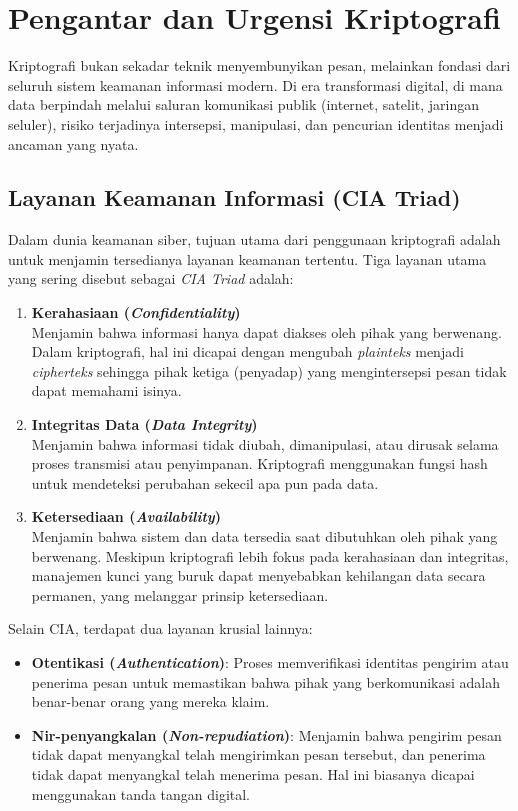 \section{Pengantar dan Urgensi Kriptografi}

Kriptografi bukan sekadar teknik menyembunyikan pesan, melainkan fondasi dari seluruh sistem keamanan informasi modern. Di era transformasi digital, di mana data berpindah melalui saluran komunikasi publik (internet, satelit, jaringan seluler), risiko terjadinya intersepsi, manipulasi, dan pencurian identitas menjadi ancaman yang nyata.

\subsection{Layanan Keamanan Informasi (CIA Triad)}

Dalam dunia keamanan siber, tujuan utama dari penggunaan kriptografi adalah untuk menjamin tersedianya layanan keamanan tertentu. Tiga layanan utama yang sering disebut sebagai \textit{CIA Triad} adalah:

\begin{enumerate}
    \item \textbf{Kerahasiaan (\textit{Confidentiality})} \\
    Menjamin bahwa informasi hanya dapat diakses oleh pihak yang berwenang. Dalam kriptografi, hal ini dicapai dengan mengubah \textit{plainteks} menjadi \textit{cipherteks} sehingga pihak ketiga (penyadap) yang mengintersepsi pesan tidak dapat memahami isinya.

    \item \textbf{Integritas Data (\textit{Data Integrity})} \\
    Menjamin bahwa informasi tidak diubah, dimanipulasi, atau dirusak selama proses transmisi atau penyimpanan. Kriptografi menggunakan fungsi hash untuk mendeteksi perubahan sekecil apa pun pada data.

    \item \textbf{Ketersediaan (\textit{Availability})} \\
    Menjamin bahwa sistem dan data tersedia saat dibutuhkan oleh pihak yang berwenang. Meskipun kriptografi lebih fokus pada kerahasiaan dan integritas, manajemen kunci yang buruk dapat menyebabkan kehilangan data secara permanen, yang melanggar prinsip ketersediaan.
\end{enumerate}

Selain CIA, terdapat dua layanan krusial lainnya:
\begin{itemize}
    \item \textbf{Otentikasi (\textit{Authentication})}: Proses memverifikasi identitas pengirim atau penerima pesan untuk memastikan bahwa pihak yang berkomunikasi adalah benar-benar orang yang mereka klaim.
    \item \textbf{Nir-penyangkalan (\textit{Non-repudiation})}: Menjamin bahwa pengirim pesan tidak dapat menyangkal telah mengirimkan pesan tersebut, dan penerima tidak dapat menyangkal telah menerima pesan. Hal ini biasanya dicapai menggunakan tanda tangan digital.
\end{itemize}

